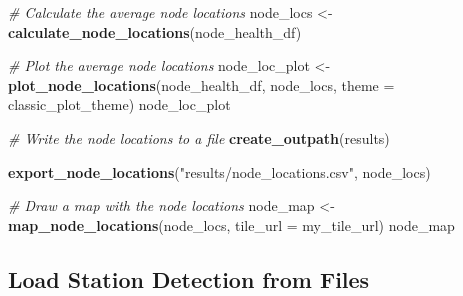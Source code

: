 \documentclass[
]{book}
\newenvironment{Shaded}{\begin{snugshade}}{\end{snugshade}}
\newcommand{\AttributeTok}[1]{\textcolor[rgb]{0.13,0.29,0.53}{#1}}
\newcommand{\CommentTok}[1]{\textcolor[rgb]{0.56,0.35,0.01}{\textit{#1}}}
\newcommand{\FunctionTok}[1]{\textcolor[rgb]{0.13,0.29,0.53}{\textbf{#1}}}
\newcommand{\NormalTok}[1]{#1}
\newcommand{\OtherTok}[1]{\textcolor[rgb]{0.56,0.35,0.01}{#1}}
\newcommand{\StringTok}[1]{\textcolor[rgb]{0.31,0.60,0.02}{#1}}
\begin{document}
\begin{Shaded}
\begin{Highlighting}[]
\CommentTok{\# Calculate the average node locations}
\NormalTok{node\_locs }\OtherTok{\textless{}{-}} \FunctionTok{calculate\_node\_locations}\NormalTok{(node\_health\_df)}

\CommentTok{\# Plot the average node locations}
\NormalTok{node\_loc\_plot }\OtherTok{\textless{}{-}} \FunctionTok{plot\_node\_locations}\NormalTok{(node\_health\_df, }
\NormalTok{                                     node\_locs,}
                                     \AttributeTok{theme =}\NormalTok{ classic\_plot\_theme)}
\NormalTok{node\_loc\_plot}

\CommentTok{\# Write the node locations to a file}
\FunctionTok{create\_outpath}\NormalTok{(}\StringTok{\textquotesingle{}results\textquotesingle{}}\NormalTok{)}

\FunctionTok{export\_node\_locations}\NormalTok{(}\StringTok{"results/node\_locations.csv"}\NormalTok{, }
\NormalTok{                      node\_locs)}

\CommentTok{\# Draw a map with the node locations}
\NormalTok{node\_map }\OtherTok{\textless{}{-}} \FunctionTok{map\_node\_locations}\NormalTok{(node\_locs, }
                               \AttributeTok{tile\_url =}\NormalTok{ my\_tile\_url)}
\NormalTok{node\_map}
\end{Highlighting}
\end{Shaded}

\subsection{Load Station Detection from Files}\label{load-station-detection-from-files}
\end{document}
